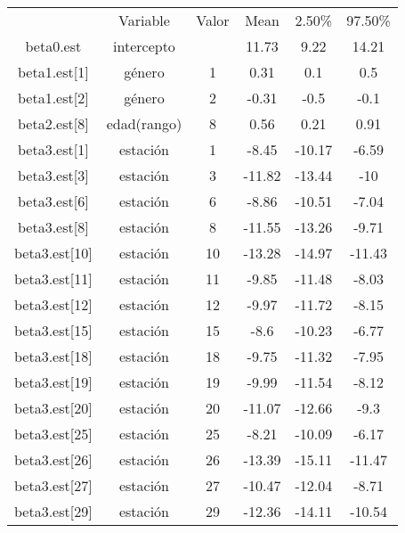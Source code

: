 

\begin{table}[]
\begin{tabular}{cccccc}
                      & Variable             & Valor  & Mean   & 2.50\% & 97.50\% \\
beta0.est             & intercepto           &        & 11.73  & 9.22   & 14.21   \\
beta1.est{[}1{]}      & género               & 1      & 0.31   & 0.1    & 0.5     \\
beta1.est{[}2{]}      & género               & 2      & -0.31  & -0.5   & -0.1    \\
beta2.est{[}8{]}      & edad(rango)          & 8      & 0.56   & 0.21   & 0.91    \\
beta3.est{[}1{]}      & estación             & 1      & -8.45  & -10.17 & -6.59   \\
beta3.est{[}3{]}      & estación             & 3      & -11.82 & -13.44 & -10     \\
beta3.est{[}6{]}      & estación             & 6      & -8.86  & -10.51 & -7.04   \\
beta3.est{[}8{]}      & estación             & 8      & -11.55 & -13.26 & -9.71   \\
beta3.est{[}10{]}     & estación             & 10     & -13.28 & -14.97 & -11.43  \\
beta3.est{[}11{]}     & estación             & 11     & -9.85  & -11.48 & -8.03   \\
beta3.est{[}12{]}     & estación             & 12     & -9.97  & -11.72 & -8.15   \\
beta3.est{[}15{]}     & estación             & 15     & -8.6   & -10.23 & -6.77   \\
beta3.est{[}18{]}     & estación             & 18     & -9.75  & -11.32 & -7.95   \\
beta3.est{[}19{]}     & estación             & 19     & -9.99  & -11.54 & -8.12   \\
beta3.est{[}20{]}     & estación             & 20     & -11.07 & -12.66 & -9.3    \\
beta3.est{[}25{]}     & estación             & 25     & -8.21  & -10.09 & -6.17   \\
beta3.est{[}26{]}     & estación             & 26     & -13.39 & -15.11 & -11.47  \\
beta3.est{[}27{]}     & estación             & 27     & -10.47 & -12.04 & -8.71   \\
beta3.est{[}29{]}     & estación             & 29     & -12.36 & -14.11 & -10.54  \\

\end{tabular}
\end{table}
